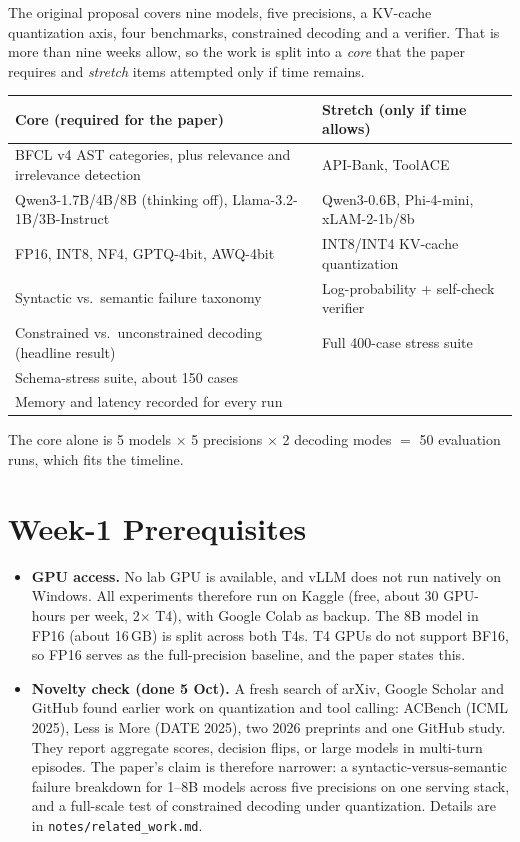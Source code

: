 \documentclass[11pt,a4paper]{article}
\begin{document}
The original proposal covers nine models, five precisions, a KV-cache quantization axis, four
benchmarks, constrained decoding and a verifier. That is more than nine weeks allow, so the work is
split into a \emph{core} that the paper requires and \emph{stretch} items attempted only if time
remains.

\begin{center}
\renewcommand{\arraystretch}{1.3}
\begin{tabularx}{\textwidth}{LL}
\toprule
\textbf{Core (required for the paper)} & \textbf{Stretch (only if time allows)} \\
\midrule
BFCL v4 AST categories, plus relevance and irrelevance detection & API-Bank, ToolACE \\
Qwen3-1.7B/4B/8B (thinking off), Llama-3.2-1B/3B-Instruct & Qwen3-0.6B, Phi-4-mini, xLAM-2-1b/8b \\
FP16, INT8, NF4, GPTQ-4bit, AWQ-4bit & INT8/INT4 KV-cache quantization \\
Syntactic vs.\ semantic failure taxonomy & Log-probability + self-check verifier \\
Constrained vs.\ unconstrained decoding (headline result) & Full 400-case stress suite \\
Schema-stress suite, about 150 cases & \\
Memory and latency recorded for every run & \\
\bottomrule
\end{tabularx}
\end{center}

The core alone is 5 models $\times$ 5 precisions $\times$ 2 decoding modes $=$ 50 evaluation runs,
which fits the timeline.

\section{Week-1 Prerequisites}

\begin{itemize}
  \item \textbf{GPU access.} No lab GPU is available, and vLLM does not run natively on Windows.
        All experiments therefore run on Kaggle (free, about 30 GPU-hours per week, 2$\times$ T4),
        with Google Colab as backup. The 8B model in FP16 (about 16\,GB) is split across both T4s.
        T4 GPUs do not support BF16, so FP16 serves as the full-precision baseline, and the paper
        states this.
  \item \textbf{Novelty check (done 5 Oct).} A fresh search of arXiv, Google Scholar and GitHub
        found earlier work on quantization and tool calling: ACBench (ICML 2025), Less is More
        (DATE 2025), two 2026 preprints and one GitHub study. They report aggregate scores, decision
        flips, or large models in multi-turn episodes. The paper's claim is therefore narrower: a
        syntactic-versus-semantic failure breakdown for 1--8B models across five precisions on one
        serving stack, and a full-scale test of constrained decoding under quantization. Details
        are in \texttt{notes/related\_work.md}.
\end{itemize}
\end{document}
